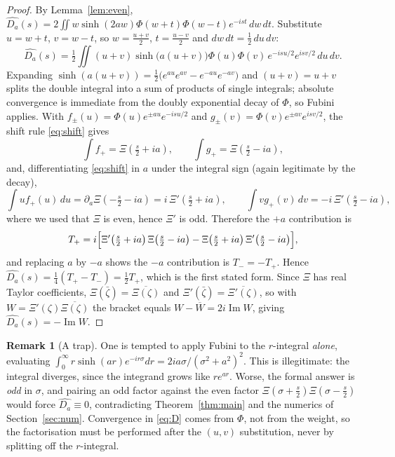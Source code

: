 \documentclass[11pt,a4paper]{amsart}
\theoremstyle{plain}
\theoremstyle{definition}
\newtheorem{remark}[theorem]{Remark}
\newcommand{\Xii}{\Xi}
\begin{document}
\begin{proof}
By Lemma~\ref{lem:even},
$\widehat{D_a}(s)=2\iint w\sinh(2aw)\Phi(w+t)\Phi(w-t)e^{-ist}\,dw\,dt$. Substitute $u=w+t$,
$v=w-t$, so $w=\tfrac{u+v}2$, $t=\tfrac{u-v}2$ and $dw\,dt=\tfrac12\,du\,dv$:
\[
  \widehat{D_a}(s)=\tfrac12\iint (u+v)\sinh\bigl(a(u+v)\bigr)\Phi(u)\Phi(v)\,
    e^{-isu/2}e^{isv/2}\,du\,dv .
\]
Expanding $\sinh(a(u+v))=\tfrac12\bigl(e^{au}e^{av}-e^{-au}e^{-av}\bigr)$ and $(u+v)=u+v$ splits the
double integral into a sum of products of single integrals; absolute convergence is immediate from
the doubly exponential decay of $\Phi$, so Fubini applies. With
$f_\pm(u)=\Phi(u)e^{\pm au}e^{-isu/2}$ and $g_\pm(v)=\Phi(v)e^{\pm av}e^{isv/2}$, the shift rule
\eqref{eq:shift} gives
\[
  \int f_+=\Xii\!\left(\tfrac s2+ia\right),\qquad \int g_+=\Xii\!\left(\tfrac s2-ia\right),
\]
and, differentiating \eqref{eq:shift} in $a$ under the integral sign (again legitimate by the decay),
\[
  \int u f_+(u)\,du=\partial_a\Xii\!\left(-\tfrac s2-ia\right)=i\,\Xii'\!\left(\tfrac s2+ia\right),
  \qquad
  \int v g_+(v)\,dv=-i\,\Xii'\!\left(\tfrac s2-ia\right),
\]
where we used that $\Xii$ is even, hence $\Xii'$ is odd. Therefore the $+a$ contribution is
\[
  T_+=i\Bigl[\Xii'\!\left(\tfrac s2+ia\right)\Xii\!\left(\tfrac s2-ia\right)
    -\Xii\!\left(\tfrac s2+ia\right)\Xii'\!\left(\tfrac s2-ia\right)\Bigr],
\]
and replacing $a$ by $-a$ shows the $-a$ contribution is $T_-=-T_+$. Hence
$\widehat{D_a}(s)=\tfrac14(T_+-T_-)=\tfrac12T_+$, which is the first stated form. Since $\Xii$ has
real Taylor coefficients, $\Xii(\bar\zeta)=\overline{\Xii(\zeta)}$ and
$\Xii'(\bar\zeta)=\overline{\Xii'(\zeta)}$, so with $W=\Xii'(\zeta)\overline{\Xii(\zeta)}$ the
bracket equals $W-\overline W=2i\operatorname{Im}W$, giving $\widehat{D_a}(s)=-\operatorname{Im}W$.
\end{proof}

\begin{remark}[A trap]\label{rem:trap}
One is tempted to apply Fubini to the $r$-integral \emph{alone}, evaluating
$\int_0^\infty r\sinh(ar)e^{-ir\sigma}dr=2ia\sigma/(\sigma^2+a^2)^2$. This is illegitimate: the
integral diverges, since the integrand grows like $re^{ar}$. Worse, the formal answer is \emph{odd}
in $\sigma$, and pairing an odd factor against the even factor
$\Xii(\sigma+\tfrac s2)\Xii(\sigma-\tfrac s2)$ would force $\widehat{D_a}\equiv0$, contradicting
Theorem~\ref{thm:main} and the numerics of Section~\ref{sec:num}. Convergence in \eqref{eq:D} comes
from $\Phi$, not from the weight, so the factorisation must be performed after the $(u,v)$
substitution, never by splitting off the $r$-integral.
\end{remark}
\end{document}
